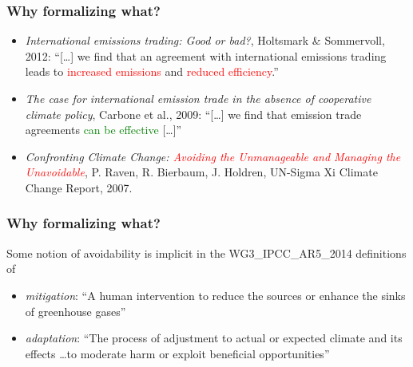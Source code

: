\documentclass[colorhighlight,coloremph]{beamer}
\begin{document}
\begin{frame}[fragile]
\frametitle{Why formalizing what?}
%
\begin{itemize}
  \vspace{0.3\normalbaselineskip}
  \item<1-> \emph{International emissions trading: Good or bad?},
    Holtsmark \& Sommervoll, 2012: ``[\ldots] we find that an agreement
    with international emissions trading leads to \textcolor<2-3>{red}{increased emissions}
    and \textcolor<2-3>{red}{reduced efficiency}.''
  \vspace{0.3\normalbaselineskip}
  \item<1-> \emph{The case for international emission trade in the
    absence of cooperative climate policy}, Carbone et al., 2009:
    ``[\ldots] we find that emission trade agreements \textcolor<3>{green}{can be effective}
    [\ldots]''
  \vspace{0.3\normalbaselineskip}
  \item<4-> \emph{Confronting Climate Change: \textcolor{red}{Avoiding the Unmanageable
    and Managing the Unavoidable}}, P. Raven, R. Bierbaum, J. Holdren,
    UN-Sigma Xi Climate Change Report, 2007.
\end{itemize}
%
\end{frame}


\begin{frame}[fragile]
\frametitle{Why formalizing what?}
%
Some notion of avoidability is implicit in the WG3\_IPCC\_AR5\_2014
definitions of
\begin{itemize}
  \vspace{0.3\normalbaselineskip}
  \item<1-> \emph{mitigation}: ``A human intervention to reduce the
    sources or enhance the sinks of greenhouse gases'' 
  \vspace{0.3\normalbaselineskip}
  \item<3-> \emph{adaptation}: ``The process of adjustment to actual or
    expected climate and its effects \dots to moderate harm or exploit
    beneficial opportunities'' 
\end{itemize}
%
\vspace{0.3\normalbaselineskip} 
%
\end{frame}
\end{document}
